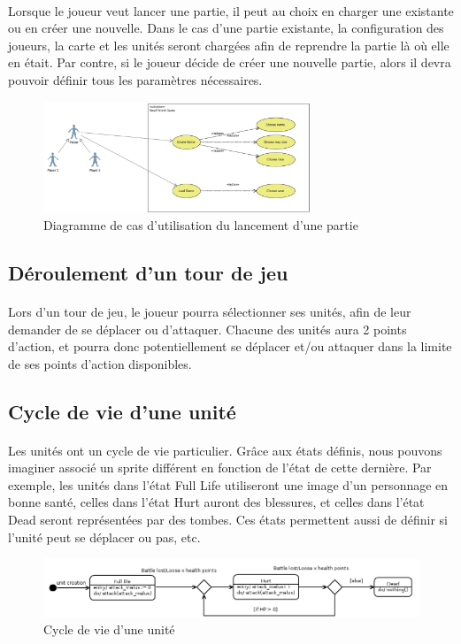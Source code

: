 \paragraph{}
Lorsque le joueur veut lancer une partie, il peut au choix en charger une existante ou en créer une nouvelle. Dans le cas d'une partie existante, la configuration des joueurs, la carte et les unités seront chargées afin de reprendre la partie là où elle en était. Par contre, si le joueur décide de créer une nouvelle partie, alors il devra pouvoir définir tous les paramètres nécessaires.

\begin{figure}[h]
  \centering
  \includegraphics[width=8cm]{schemas/uc_game_creation.png}
  \caption{Diagramme de cas d'utilisation du lancement d'une partie}
  \label{uc_game_creation}
\end{figure}


\subsection{Déroulement d'un tour de jeu}

\paragraph{}
Lors d'un tour de jeu, le joueur pourra sélectionner ses unités, afin de leur demander de se déplacer ou d'attaquer. Chacune des unités aura 2 points d'action, et pourra donc potentiellement se déplacer et/ou attaquer dans la limite de ses points d'action disponibles.


\subsection{Cycle de vie d'une unité}

\paragraph{}
Les unités ont un cycle de vie particulier. Grâce aux états définis, nous pouvons imaginer associé un sprite différent en fonction de l'état de cette dernière. Par exemple, les unités dans l'état \og{} Full Life \fg{} utiliseront une image d'un personnage en bonne santé, celles dans l'état \og{} Hurt \fg{}  auront des blessures, et celles dans l'état \og{} Dead \fg{}  seront représentées par des tombes. Ces états permettent aussi de définir si l'unité peut se déplacer ou pas, etc.

\begin{figure}[!h]
  \centering
  \includegraphics[width=13cm]{schemas/state-diagram.png}
  \caption{Cycle de vie d'une unité}
  \label{state-diagram}
\end{figure}


